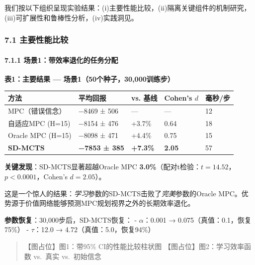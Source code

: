 \documentclass[UTF8]{ctexart}
\let\oldparagraph\paragraph
\renewcommand{\paragraph}[1]{\oldparagraph{#1}\mbox{}}
\begin{document}
我们按以下组织呈现实验结果：(i)主要性能比较，(ii)隔离关键组件的机制研究，(iii)可扩展性和鲁棒性分析，(iv)实践洞见。

\hypertarget{ux4e3bux8981ux6027ux80fdux6bd4ux8f83}{%
\subsubsection{7.1
主要性能比较}\label{ux4e3bux8981ux6027ux80fdux6bd4ux8f83}}

\hypertarget{ux573aux666f1ux5e26ux6548ux7387ux9000ux5316ux7684ux4efbux52a1ux5206ux914d-1}{%
\paragraph{7.1.1
场景1：带效率退化的任务分配}\label{ux573aux666f1ux5e26ux6548ux7387ux9000ux5316ux7684ux4efbux52a1ux5206ux914d-1}}

\textbf{表1：主要结果 --- 场景1（50个种子，30,000训练步）}

\begin{table}[h]
\centering
\begin{tabular}{p{3.5cm}p{3.5cm}p{2.5cm}p{2.5cm}p{2cm}}
\toprule
\textbf{方法} & \textbf{平均回报} & \textbf{vs. 基线} & \textbf{Cohen's \(d\)} & \textbf{毫秒/步} \\
\midrule
MPC（错误信念） & −8469 ± 506 & --- & --- & 12 \\
自适应MPC (H=15) & −8154 ± 476 & +3.7\% & 0.64 & 18 \\
Oracle MPC (H=15) & −8098 ± 471 & +4.4\% & 0.75 & 15 \\
\textbf{SD-MCTS} & \textbf{−7853 ± 385} & \textbf{+7.3\%} & \textbf{2.05} & 57 \\
\bottomrule
\end{tabular}
\end{table}

\textbf{关键发现}：SD-MCTS显著超越Oracle MPC
\textbf{3.0\%}（配对t检验：\(t = 14.52\)，\(p < 0.0001\)，Cohen's
\(d = 2.05\)）。

这是一个惊人的结果：\emph{学习}参数的SD-MCTS击败了\emph{完美}参数的Oracle
MPC。优势源于价值网络能够预测MPC规划视界之外的长期效率退化。

\textbf{参数恢复}：30,000步后，SD-MCTS恢复： - \(\alpha\)：0.001 →
0.075（真值：0.1，恢复75\%） - \(\tau\)：12.0 →
4.72（真值：5.0，恢复94\%）

\begin{quote}
【图占位】图1：带95\% CI的性能比较柱状图 【图占位】图2：学习效率函数
vs.~真实 vs.~初始信念
\end{quote}
\end{document}
